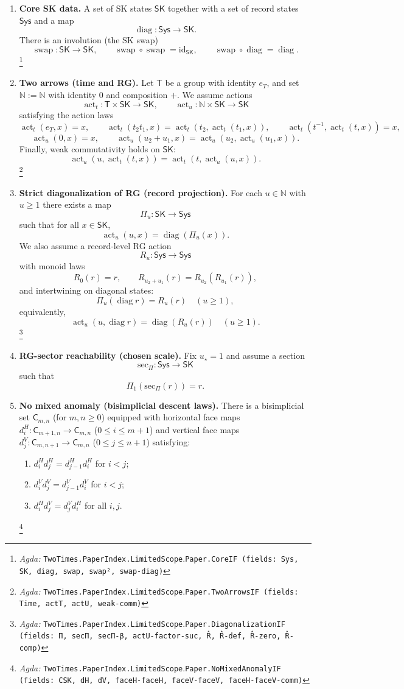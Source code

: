 \documentclass{article}
\newcommand{\Sys}{\mathsf{Sys}}
\newcommand{\SK}{\mathsf{SK}}
\newcommand{\Time}{\mathsf{T}}
\newcommand{\RG}{\mathbb{N}}
\newcommand{\CSK}{\mathsf{C}}
\newcommand{\diag}{\operatorname{diag}}
\newcommand{\swap}{\operatorname{swap}}
\newcommand{\actT}{\operatorname{act}_t}
\newcommand{\actU}{\operatorname{act}_u}
\newcommand{\Agda}[1]{\texttt{#1}}
\newcommand{\AgdaRef}[2]{\emph{Agda: }\Agda{#1}.\Agda{#2}}
\newcommand{\AgdaNote}[2]{\footnote{\AgdaRef{#1}{#2}}}
\theoremstyle{definition}
\theoremstyle{plain}
\begin{document}
\begin{enumerate}[label=\textbf{(A\arabic*)},leftmargin=*,itemsep=0.6em]
\item \textbf{Core SK data.}
A set of SK states $\SK$ together with a set of record states $\Sys$ and a map
\[\diag:\Sys\to\SK.\]
There is an involution (the SK swap)
\[\swap:\SK\to\SK,\qquad \swap\circ\swap=\mathrm{id}_{\SK},\qquad \swap\circ\diag=\diag.\]
\AgdaNote{TwoTimes.PaperIndex.LimitedScope}{Paper.CoreIF (fields: Sys, SK, diag, swap, swap², swap-diag)}

\item \textbf{Two arrows (time and RG).}
Let $\Time$ be a group with identity $e_T$, and set $\RG:=\mathbb N$ with identity
$0$ and composition $+$.
We assume actions
\[
\actT:\Time\times\SK\to\SK,\qquad \actU:\RG\times\SK\to\SK
\]
satisfying the action laws
\[
\actT(e_T,x)=x,\qquad \actT(t_2t_1,x)=\actT(t_2,\actT(t_1,x)),\qquad
\actT(t^{-1},\actT(t,x))=x,
\]
\[
\actU(0,x)=x,\qquad \actU(u_2+u_1,x)=\actU(u_2,\actU(u_1,x)).
\]
Finally, weak commutativity holds on $\SK$:
\[
\actU(u,\actT(t,x))=\actT(t,\actU(u,x)).
\]
\AgdaNote{TwoTimes.PaperIndex.LimitedScope}{Paper.TwoArrowsIF (fields: Time, actT, actU, weak-comm)}

\item \textbf{Strict diagonalization of RG (record projection).}
For each $u\in\mathbb N$ with $u\ge 1$ there exists a map
\[
\Pi_{u}:\SK\to\Sys
\]
such that for all $x\in\SK$,
\[
\actU(u,x)=\diag(\Pi_{u}(x)).
\]
We also assume a record-level RG action
\[
R_u:\Sys\to\Sys
\]
with monoid laws
\[
R_0(r)=r,\qquad R_{u_2+u_1}(r)=R_{u_2}(R_{u_1}(r)),
\]
and intertwining on diagonal states:
\[
\Pi_{u}(\diag r)=R_{u}(r)\quad (u\ge 1),
\]
equivalently,
\[
\actU(u,\diag r)=\diag(R_u(r))\quad (u\ge 1).
\]
\AgdaNote{TwoTimes.PaperIndex.LimitedScope}{Paper.DiagonalizationIF (fields: Π, secΠ, secΠ-β, actU-factor-suc, R̂, R̂-def, R̂-zero, R̂-comp)}

\item \textbf{RG-sector reachability (chosen scale).}
Fix $u_\star=1$ and assume a section
\[
\mathrm{sec}_\Pi:\Sys\to\SK
\]
such that
\[
\Pi_{1}(\mathrm{sec}_\Pi(r))=r.
\]

\item \textbf{No mixed anomaly (bisimplicial descent laws).}
There is a bisimplicial set $\CSK_{m,n}$ (for $m,n\ge 0$) equipped with
horizontal face maps $d^H_i:\CSK_{m+1,n}\to\CSK_{m,n}$ ($0\le i\le m+1$)
and vertical face maps $d^V_j:\CSK_{m,n+1}\to\CSK_{m,n}$ ($0\le j\le n+1$)
satisfying:
\begin{enumerate}[label=\textbf{(A5.\alph*)},leftmargin=*,itemsep=0.4em]
\item $d^H_i d^H_j = d^H_{j-1} d^H_i$ for $i<j$;
\item $d^V_i d^V_j = d^V_{j-1} d^V_i$ for $i<j$;
\item $d^H_i d^V_j = d^V_j d^H_i$ for all $i,j$.
\end{enumerate}
\AgdaNote{TwoTimes.PaperIndex.LimitedScope}{Paper.NoMixedAnomalyIF (fields: CSK, dH, dV, faceH-faceH, faceV-faceV, faceH-faceV-comm)}


\end{enumerate}
\end{document}
